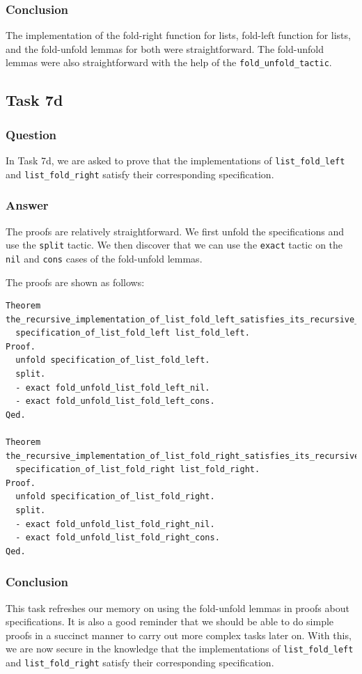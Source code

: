 \documentclass{article}
\begin{document}
\subsubsection{Conclusion}

The implementation of the fold-right function for lists, fold-left function for lists, and the fold-unfold lemmas for both were straightforward. The fold-unfold lemmas were also straightforward with the help of the \texttt{fold\_unfold\_tactic}.

\subsection{Task 7d}

\subsubsection{Question}
In Task 7d, we are asked to prove that the implementations of \texttt{list\_fold\_left} and \texttt{list\_fold\_right} satisfy their corresponding specification.

\subsubsection{Answer}
The proofs are relatively straightforward. We first unfold the specifications and use the \texttt{split} tactic. We then discover that we can use the \texttt{exact} tactic on the \texttt{nil} and \texttt{cons} cases of the fold-unfold lemmas.

The proofs are shown as follows:

\begin{lstlisting}
Theorem the_recursive_implementation_of_list_fold_left_satisfies_its_recursive_specification:
  specification_of_list_fold_left list_fold_left.
Proof.
  unfold specification_of_list_fold_left.
  split.
  - exact fold_unfold_list_fold_left_nil.
  - exact fold_unfold_list_fold_left_cons.
Qed.

Theorem the_recursive_implementation_of_list_fold_right_satisfies_its_recursive_specification:
  specification_of_list_fold_right list_fold_right.
Proof.
  unfold specification_of_list_fold_right.
  split.
  - exact fold_unfold_list_fold_right_nil.
  - exact fold_unfold_list_fold_right_cons.
Qed.
\end{lstlisting}

\subsubsection{Conclusion}
This task refreshes our memory on using the fold-unfold lemmas in proofs about specifications. It is also a good reminder that we should be able to do simple proofs in a succinct manner to carry out more complex tasks later on. With this, we are now secure in the knowledge that the implementations of \texttt{list\_fold\_left} and \texttt{list\_fold\_right} satisfy their corresponding specification.
\end{document}
